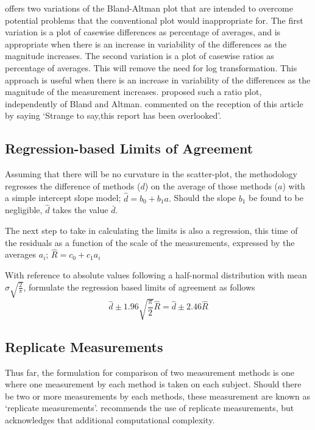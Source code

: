 \documentclass[12pt, a4paper]{report}
\begin{document}
\citet{BA99} offers two variations of the Bland-Altman plot that
are intended to overcome potential problems that the conventional
plot would inappropriate for. The first variation is a plot of
casewise differences as percentage of averages, and is appropriate
when there is an increase in variability of the differences as the
magnitude increases. The second variation is a plot of casewise
ratios as percentage of averages. This will remove the need for
log transformation. This approach is useful when there is an
increase in variability of the differences as the magnitude of the
measurement increases. \citet{Eksborg} proposed such a ratio plot,
independently of Bland and Altman. \citet{Dewitte} commented on
the reception of this article by saying `Strange to say,this
report has been overlooked'.




\subsection{Regression-based Limits of Agreement} Assuming that
there will be no curvature in the scatter-plot, the methodology
regresses the difference of methods ($d$) on the average of those
methods ($a$) with a simple intercept slope model; $\hat{d} =
b_{0}+ b_{1}a.$ Should the slope $b_{1}$ be found to be
negligible, $\hat{d}$ takes the value $\bar{d}$.

The next step to take in calculating the limits is also a
regression, this time of the residuals as a function of the scale
of the measurements, expressed by the averages $a_{i}$;
 $ \hat{R} = c_{0}+ c_{1}a_{i}$

With reference to absolute values following a half-normal
distribution with mean $\sigma\sqrt{\frac{2}{\pi}}$, \citet{BA99} formulate the regression based limits of agreement as
follows
 \begin{equation}
  \hat{d} \pm 1.96\sqrt{\frac{\pi}{2}}\hat{R} = \hat{d} \pm 2.46\hat{R}
 \end{equation}

\subsection{Replicate Measurements}

Thus far, the formulation for comparison of two measurement
methods is one where one measurement by each method is taken on
each subject. Should there be two or more measurements by each
methods, these measurement are known as `replicate measurements'.
\citet{BXC2008} recommends the use of replicate measurements, but
acknowledges that  additional computational complexity.
\end{document}

